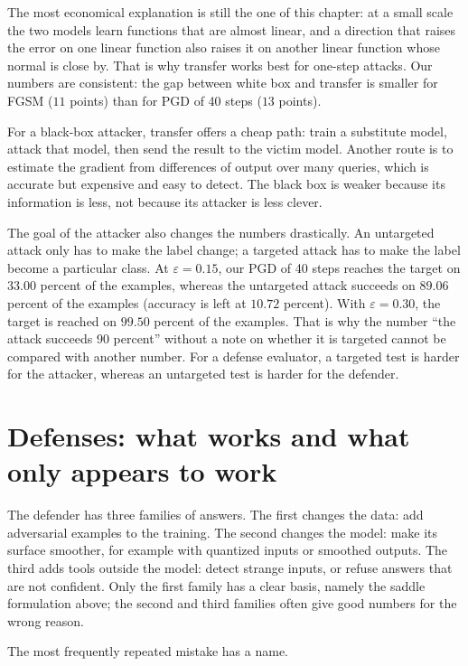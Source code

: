 The most economical explanation is still the one of this chapter: at a small scale
the two models learn functions that are almost linear, and a direction that raises
the error on one linear function also raises it on another linear function whose
normal is close by. That is why transfer works best for one-step attacks. Our numbers
are consistent: the gap between white box and transfer is smaller for FGSM ($11$
points) than for PGD of 40 steps ($13$ points).

For a black-box attacker, transfer offers a cheap path: train a substitute model,
attack that model, then send the result to the victim model. Another route is to
estimate the gradient from differences of output over many queries, which is accurate
but expensive and easy to detect. The black box is weaker because its information is
less, not because its attacker is less clever.

The goal of the attacker also changes the numbers drastically. An untargeted attack
only has to make the label change; a targeted attack has to make the label become a
particular class. At $\varepsilon=0.15$, our PGD of 40 steps reaches the target on
$33.00$ percent of the examples, whereas the untargeted attack succeeds on
$89.06$ percent of the examples (accuracy is left at $10.72$ percent). With
$\varepsilon=0.30$, the target is reached on $99.50$ percent of the
examples. That is why the number ``the attack succeeds 90 percent'' without a note on
whether it is targeted cannot be compared with another number. For a defense
evaluator, a targeted test is harder for the attacker, whereas an untargeted test is
harder for the defender.

\section{Defenses: what works and what only appears to work}

The defender has three families of answers. The first changes the data: add
adversarial examples to the training. The second changes the model: make its surface
smoother, for example with quantized inputs or smoothed outputs. The third adds tools
outside the model: detect strange inputs, or refuse answers that are not confident.
Only the first family has a clear basis, namely the saddle formulation above; the
second and third families often give good numbers for the wrong reason.

The most frequently repeated mistake has a name.

